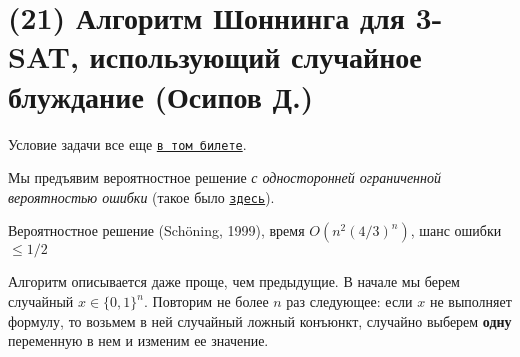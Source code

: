 \section{(21) Алгоритм Шоннинга для 3-SAT, использующий случайное блуждание (Осипов Д.)}

Условие задачи все еще \hyperlink{3sat}{\texttt{в том билете}}.

Мы предъявим вероятностное решение \textit{с односторонней ограниченной вероятностью ошибки} (такое было \hyperlink{Freivalds}{\texttt{здесь}}).

\begin{algodescription}{Вероятностное решение (Sch\"oning, 1999), время $O(n^2(4/3)^n)$, шанс ошибки $\leq 1/2$ }

Алгоритм описывается даже проще, чем предыдущие. В начале мы берем случайный $x \in \{0, 1\}^n$. Повторим не более $n$ раз следующее: если $x$ не выполняет формулу, то возьмем в ней случайный ложный конъюнкт, случайно выберем \textbf{одну} переменную в нем и изменим ее значение.
\end{algodescription}

